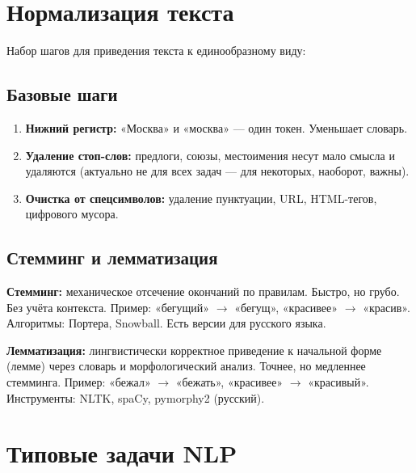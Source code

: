 \documentclass[a4paper,12pt]{article}
\begin{document}
\section{Нормализация текста}

Набор шагов для приведения текста к единообразному виду:

\subsection{Базовые шаги}

\begin{enumerate}
    \item \textbf{Нижний регистр:} «Москва» и «москва» — один токен. Уменьшает словарь.
    \item \textbf{Удаление стоп-слов:} предлоги, союзы, местоимения несут мало смысла и удаляются (актуально не для всех задач — для некоторых, наоборот, важны).
    \item \textbf{Очистка от спецсимволов:} удаление пунктуации, URL, HTML-тегов, цифрового мусора.
\end{enumerate}

\subsection{Стемминг и лемматизация}

\textbf{Стемминг:} механическое отсечение окончаний по правилам. Быстро, но грубо. Без учёта контекста. Пример: «бегущий» $\to$ «бегущ», «красивее» $\to$ «красив». Алгоритмы: Портера, Snowball. Есть версии для русского языка.

\textbf{Лемматизация:} лингвистически корректное приведение к начальной форме (лемме) через словарь и морфологический анализ. Точнее, но медленнее стемминга. Пример: «бежал» $\to$ «бежать», «красивее» $\to$ «красивый». Инструменты: NLTK, spaCy, pymorphy2 (русский).

\section{Типовые задачи NLP}
\end{document}
